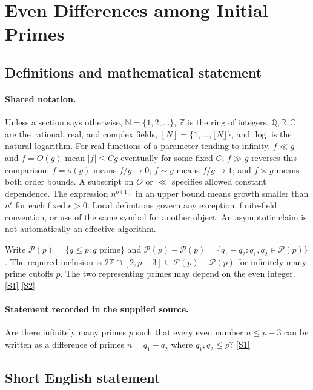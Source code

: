 \documentclass[11pt,a4paper]{article}
\newcommand{\N}{\mathbb{N}}
\newcommand{\Z}{\mathbb{Z}}
\newcommand{\Q}{\mathbb{Q}}
\newcommand{\R}{\mathbb{R}}
\newcommand{\C}{\mathbb{C}}
\newcommand{\sref}[2]{\hyperlink{source:#1:#2}{[S#2]}}
\begin{document}
\section{Even Differences among Initial Primes}\label{statement}


\subsection{Definitions and mathematical statement}

\paragraph{Shared notation.}Unless a section says otherwise, $\N=\{1,2,\ldots\}$,
$\Z$ is the ring of integers, $\Q,\R,\C$ are the rational, real, and complex
fields, $[N]=\{1,\ldots,\lfloor N\rfloor\}$, and $\log$ is the natural
logarithm. For real functions of a parameter tending to infinity,
$f\ll g$ and $f=O(g)$ mean $|f|\leq Cg$ eventually for some fixed $C$;
$f\gg g$ reverses this comparison; $f=o(g)$ means $f/g\to0$;
$f\sim g$ means $f/g\to1$; and $f\asymp g$ means both order bounds.
A subscript on $O$ or $\ll$ specifies allowed constant dependence.
The expression $n^{o(1)}$ in an upper bound means growth smaller than
$n^\epsilon$ for each fixed $\epsilon>0$. Local definitions govern any
exception, finite-field convention, or use of the same symbol for another
object. An asymptotic claim is not automatically an effective algorithm.



Write $\mathcal P(p)=\{q\leq p:q\text{ prime}\}$ and $\mathcal P(p)-\mathcal P(p)=\{q_1-q_2:q_1,q_2\in\mathcal P(p)\}$. The required inclusion is $2\Z\cap[2,p-3]\subseteq\mathcal P(p)-\mathcal P(p)$ for infinitely many prime cutoffs $p$. The two representing primes may depend on the even integer. \sref{statement}{1} \sref{statement}{2}

\paragraph{Statement recorded in the supplied source.}
Are there infinitely many primes $p$ such that every even number $n\leq p-3$ can be written as a difference of primes $n=q_1-q_2$ where $q_1,q_2\leq p$? \sref{statement}{1}

\subsection{Short English statement}
\end{document}
